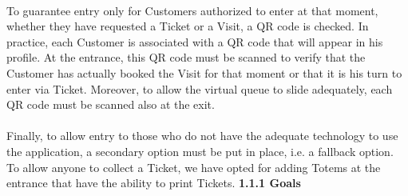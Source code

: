 \documentclass[a4paper, 10pt, oneside]{article}
\begin{document}
\\
To guarantee entry only for Customers authorized to enter at that moment, whether they have requested a Ticket or a Visit, a QR code is checked. In practice, each Customer is associated with a QR code that will appear in his profile. At the entrance, this QR code must be scanned to verify that the Customer has actually booked the Visit for that moment or that it is his turn to enter via Ticket. Moreover, to allow the virtual queue to slide adequately, each QR code must be scanned also at the exit.\\
\\
Finally, to allow entry to those who do not have the adequate technology to use the application, a secondary option must be put in place, i.e. a fallback option. To allow anyone to collect a Ticket, we have opted for adding Totems at the entrance that have the ability to print Tickets.
\newline
\newline
\newline
{\large \textbf{1.1.1 Goals}}
\end{document}
